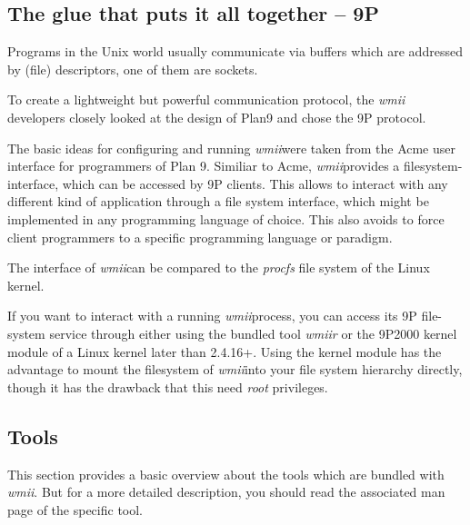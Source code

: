 \documentclass[12pt,a4paper]{article} %
\newcommand{\wmii}{\emph{wmii}}
\begin{document}
    \subsection{The glue that puts it all together -- 9P}

    Programs in the Unix world usually communicate via buffers which are
    addressed by (file) descriptors, one of them are sockets.

    To create a lightweight but powerful communication protocol, the \wmii
    developers closely looked at the design of Plan9 and chose the 9P
    protocol.

    The basic ideas for configuring and running \wmii were taken from
    the Acme user interface for programmers of Plan 9. Similiar to Acme,
    \wmii provides a filesystem-interface, which can be accessed by
    9P clients. This allows to interact with any different kind of
    application through a file system interface, which might be implemented
    in any programming language of choice. This also avoids to force
    client programmers to a specific programming language or paradigm.
    
    The interface of \wmii can be compared to the \emph{procfs} file
    system of the Linux kernel.

    If you want to interact with a running \wmii process, you can access its 9P
    file-system service through either using the bundled tool \emph{wmiir} or
    the 9P2000 kernel module of a Linux kernel later than 2.4.16+.  Using the
    kernel module has the advantage to mount the filesystem of \wmii into your
    file system hierarchy directly, though it has the drawback that this need
    \emph{root} privileges.

    \subsection{Tools}

    This section provides a basic overview about the tools which are bundled
    with \wmii. But for a more detailed description, you should read the associated
    man page of the specific tool.
    
\end{document}
